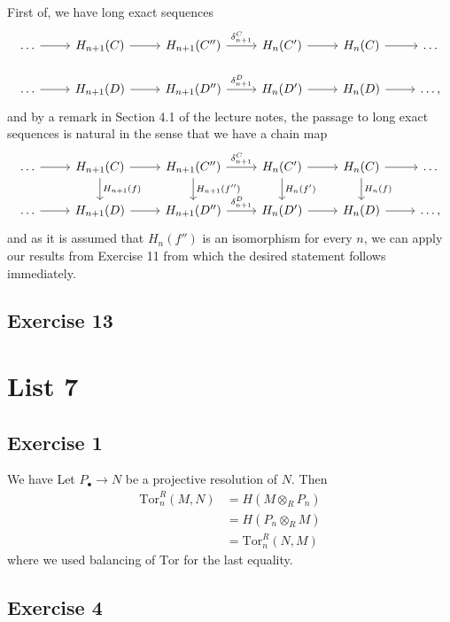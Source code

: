\documentclass{article}
\theoremstyle{definition}
\newcommand{\Tor}{\text{Tor}}
\begin{document}
First of, we have long exact sequences 
\[
\begin{tikzcd}
	\ldots
	\ar{r}
	& H_{n+1}(C)
	\ar{r}
	& H_{n+1}(C'')
	\ar{r}{\delta^{C}_{n + 1}}
	& H_{n}(C')
	\ar{r}
	& H_{n}(C)
	\ar{r}
	& \ldots \\
	\ldots
	\ar{r}
	& H_{n+1}(D)
	\ar{r}
	& H_{n+1}(D'')
	\ar{r}{\delta^{D}_{n + 1}}
	& H_{n}(D')
	\ar{r}
	& H_{n}(D)
	\ar{r}
	& \ldots,
\end{tikzcd}
\] 
and by a remark in Section 4.1 of the lecture notes, the passage to long exact sequences 
is natural in the sense that we have a chain map
\[
\begin{tikzcd}
	\ldots
	\ar{r}
	& H_{n+1}(C)
	\ar{d}{H_{n+1}(f)}
	\ar{r}
	& H_{n+1}(C'')
	\ar{r}{\delta^{C}_{n + 1}}
	\ar{d}{H_{n+1}(f'')}
	& H_{n}(C')
	\ar{r}
	\ar{d}{H_{n}(f')}
	& H_{n}(C)
	\ar{r}
	\ar{d}{H_{n}(f)}
	& \ldots \\
	\ldots
	\ar{r}
	& H_{n+1}(D)
	\ar{r}
	& H_{n+1}(D'')
	\ar{r}{\delta^{D}_{n + 1}}
	& H_{n}(D')
	\ar{r}
	& H_{n}(D)
	\ar{r}
	& \ldots,
\end{tikzcd}
\]
and as it is assumed that $H_n(f'')$ is an isomorphism for every $n$, we can
apply our results from Exercise 11 from which the desired statement follows
immediately.

\subsection*{Exercise 13}

\section*{List 7}
\subsection*{Exercise 1}
We have Let $P_{\bullet} \to N$ be a projective resolution of $N$. Then
\begin{align*}
	\Tor_{n}^{R}(M, N)
	&=
	H(M \otimes_{R} P_{n}) \\
	&=
	H(P_{n} \otimes_{R} M) \\
	&=
	\Tor_{n}^{R}(N, M)
\end{align*}
where we used balancing of $\Tor$ for the last equality.

\subsection*{Exercise 4}
\end{document}
